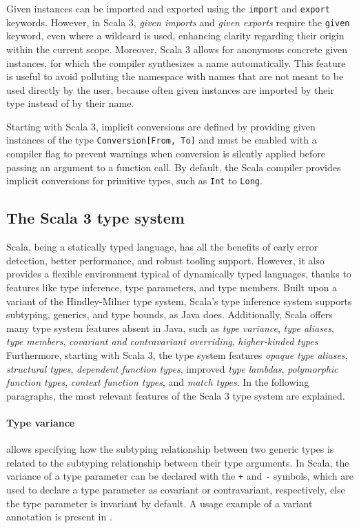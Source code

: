 Given instances can be imported and exported using the \texttt{import} and \texttt{export} keywords.
%
However, in Scala 3, \textit{given imports} and \textit{given exports} require the \texttt{given} keyword, even where a wildcard is used, enhancing clarity regarding their origin within the current scope.
%
Moreover, Scala 3 allows for anonymous concrete given instances, for which the compiler synthesizes a name automatically.
%
This feature is useful to avoid polluting the namespace with names that are not meant to be used directly by the user, because often given instances are imported by their type instead of by their name.

Starting with Scala 3, implicit conversions are defined by providing given instances of the type \texttt{Conversion[From, To]} and must be enabled with a compiler flag to prevent warnings when conversion is silently applied before passing an argument to a function call.
%
By default, the Scala compiler provides implicit conversions for primitive types, such as \texttt{Int} to \texttt{Long}.


\subsection{The Scala 3 type system} \label{chap:background->sec:scala3->subsec:type-system}

Scala, being a statically typed language, has all the benefits of early error detection, better performance, and robust tooling support.
%
However, it also provides a flexible environment typical of dynamically typed languages, thanks to features like type inference, type parameters, and type members.
%
Built upon a variant of the Hindley-Milner type system, Scala's type inference system supports subtyping, generics, and type bounds, as Java does.
%
Additionally, Scala offers many type system features absent in Java, such as \textit{type variance}, \textit{type aliases}, \textit{type members}, \textit{covariant and contravariant overriding}, \textit{higher-kinded types}
%
Furthermore, starting with Scala 3, the type system features \textit{opaque type aliases}, \textit{structural types}, \textit{dependent function types}, improved \textit{type lambdas}, \textit{polymorphic function types}, \textit{context function types}, and \textit{match types}.
%
In the following paragraphs, the most relevant features of the Scala 3 type system are explained.

\paragraph{Type variance} allows specifying how the subtyping relationship between two generic types is related to the subtyping relationship between their type arguments.
%
In Scala, the variance of a type parameter can be declared with the \texttt{+} and \texttt{-} symbols, which are used to declare a type parameter as covariant or contravariant, respectively, else the type parameter is invariant by default.
%
A usage example of a variant annotation is present in .

